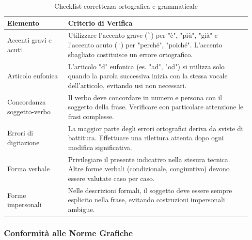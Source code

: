\documentclass[a4paper,11pt,oneside]{scrartcl}
\begin{document}
\begin{table}[H]
    \centering
    \renewcommand{\arraystretch}{1.4}
    \begin{tabularx}{\textwidth}{@{}p{}X@{}}
        \toprule
        \textbf{Elemento}          & \textbf{Criterio di Verifica}                                                                                                                                                     \\
        \midrule
        Accenti gravi e acuti      & Utilizzare l'accento grave (\texttt{\`{}}) per "è", "più", "già" e l'accento acuto (\texttt{\'{}}) per "perché", "poiché". L'accento sbagliato costituisce un errore ortografico. \\
        \midrule
        Articolo eufonica          & L'articolo "d" eufonica (es. "ad", "od") si utilizza solo quando la parola successiva inizia con la stessa vocale dell'articolo, evitando usi non necessari.                      \\
        \midrule
        Concordanza soggetto-verbo & Il verbo deve concordare in numero e persona con il soggetto della frase. Verificare con particolare attenzione le frasi complesse.                                               \\
        \midrule
        Errori di digitazione      & La maggior parte degli errori ortografici deriva da sviste di battitura. Effettuare una rilettura attenta dopo ogni modifica significativa.                                       \\
        \midrule
        Forma verbale              & Privilegiare il presente indicativo nella stesura tecnica. Altre forme verbali (condizionale, congiuntivo) devono essere valutate caso per caso.                                  \\
        \midrule
        Forme impersonali          & Nelle descrizioni formali, il soggetto deve essere sempre esplicito nella frase, evitando costruzioni impersonali ambigue.                                                        \\
        \bottomrule
    \end{tabularx}
    \caption{Checklist correttezza ortografica e grammaticale}
\end{table}

\subsubsection{Conformità alle Norme Grafiche}
\end{document}
